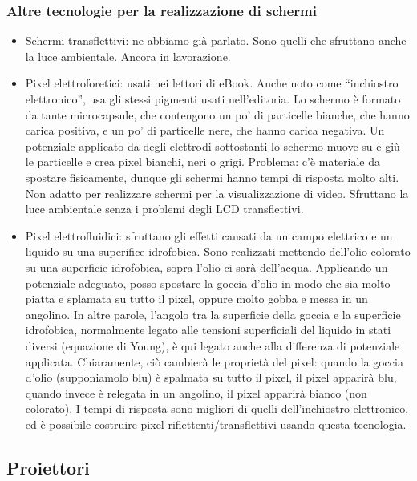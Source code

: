\documentclass[a4paper,11pt]{article}
\begin{document}
\subsubsection{Altre tecnologie per la realizzazione di schermi}
\begin{itemize}
    \item Schermi transflettivi: ne abbiamo già parlato. Sono quelli che sfruttano anche la luce ambientale. Ancora in lavorazione.
    \item Pixel elettroforetici: usati nei lettori di eBook. Anche noto come ``inchiostro elettronico'', usa gli stessi pigmenti
    usati nell'editoria. Lo schermo è formato da tante microcapsule, che contengono un po' di particelle bianche, che hanno carica
    positiva, e un po' di particelle nere, che hanno carica negativa. Un potenziale applicato da degli elettrodi sottostanti lo schermo
    muove su e giù le particelle e crea pixel bianchi, neri o grigi. Problema: c'è materiale da spostare fisicamente, dunque gli schermi
    hanno tempi di risposta molto alti. Non adatto per realizzare schermi per la visualizzazione di video. Sfruttano la luce ambientale senza i problemi degli LCD transflettivi.
    \item Pixel elettrofluidici: sfruttano gli effetti causati da un campo elettrico e un liquido su una superifice idrofobica.
    Sono realizzati mettendo dell'olio colorato su una superficie
    idrofobica, sopra l'olio ci sarà dell'acqua. Applicando un potenziale adeguato, posso spostare la goccia d'olio in modo che
    sia molto piatta e splamata su tutto il pixel, oppure molto gobba e messa in un angolino. In altre parole, l'angolo tra la superficie della goccia e la superficie idrofobica, normalmente legato alle tensioni 
    superficiali del liquido in stati diversi (equazione di Young), è qui legato anche alla differenza di potenziale applicata. Chiaramente, ciò cambierà le
    proprietà del pixel: quando la goccia d'olio (supponiamolo blu) è spalmata su tutto il pixel, il pixel apparirà blu, quando invece è relegata in un
    angolino, il pixel apparirà bianco (non colorato). I tempi di risposta sono migliori di quelli dell'inchiostro elettronico, ed è possibile costruire
    pixel riflettenti/transflettivi usando questa tecnologia.
\end{itemize}

\subsection{Proiettori}
\end{document}
